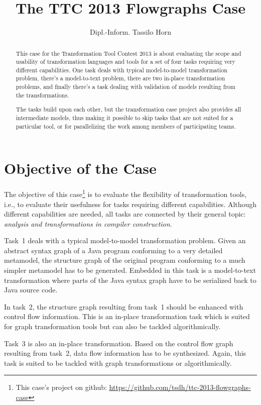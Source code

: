 \documentclass[submission]{eptcs}
\title{The TTC 2013 Flowgraphs Case}
\author{Dipl.-Inform. Tassilo Horn
  \email{\myemail}
  \institute{University Koblenz-Landau, Institute for Software Technology, Germany}}
\begin{document}
\maketitle

\begin{abstract}
  This case for the Transformation Tool Contest 2013 is about evaluating the
  scope and usability of transformation languages and tools for a set of four
  tasks requiring very different capabilities.  One task deals with typical
  model-to-model transformation problem, there's a model-to-text problem, there
  are two in-place transformation problems, and finally there's a task dealing
  with validation of models resulting from the transformations.

  The tasks build upon each other, but the transformation case project also
  provides all intermediate models, thus making it possible to skip tasks that
  are not suited for a particular tool, or for parallelizing the work among
  members of participating teams.
\end{abstract}


\section{Objective of the Case}
\label{sec:objective}

The objective of this case\footnote{This case's project on github:
  \url{https://github.com/tsdh/ttc-2013-flowgraphs-case}} is to evaluate the
flexibility of transformation tools, i.e., to evaluate their usefulness for
tasks requiring different capabilities.  Although different capabilities are
needed, all tasks are connected by their general topic: \emph{analysis and
  transformations in compiler construction}.

Task~1 deals with a typical model-to-model transformation problem.  Given an
abstract syntax graph of a Java program conforming to a very detailed
metamodel, the structure graph of the original program conforming to a much
simpler metamodel has to be generated.  Embedded in this task is a
model-to-text transformation where parts of the Java syntax graph have to be
serialized back to Java source code.

In task~2, the structure graph resulting from task~1 should be enhanced with
control flow information.  This is an in-place transformation task which is
suited for graph transformation tools but can also be tackled algorithmically.

Task~3 is also an in-place transformation.  Based on the control flow graph
resulting from task~2, data flow information has to be synthesized.  Again,
this task is suited to be tackled with graph transformations or
algorithmically.
\end{document}
